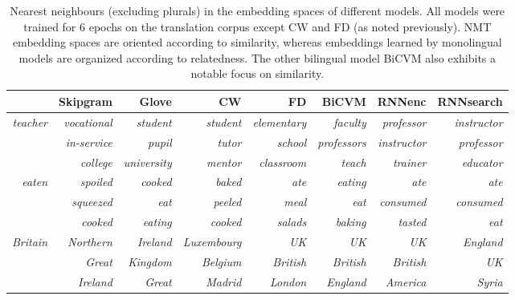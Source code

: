 \documentclass{article} %
\begin{document}
\begin{table}[t]
\begin{center}
\begin{tabular}{r | r  r  r | r r | r r}
&\bf Skipgram &\bf Glove &\bf CW&\bf FD &\bf BiCVM  &\bf RNNenc &\bf RNNsearch \\ 
\hline
\emph{teacher}  & {\small \emph{vocational}} &  {\small \emph{student}} 
& {\small \emph{student}} &{\small \emph{elementary}} & {\small  \emph{faculty}} & {\small \emph{professor}}  & {\small \emph{instructor}} \\ 
 & {\small \emph{in-service}} &  {\small \emph{pupil}} 
& {\small \emph{tutor}} & {\small \emph{school}}& {\small  \emph{professors}} & {\small \emph{instructor}}  & {\small \emph{professor}} \\ 
 & {\small \emph{college}} &  {\small \emph{university}} 
& {\small \emph{mentor}} & {\small \emph{classroom}}& {\small \emph{teach}}& {\small \emph{trainer}}  & {\small \emph{educator}} \\ 
\hdashline
\emph{eaten}  & {\small \emph{spoiled}} &  {\small \emph{cooked}} 
&  {\small \emph{baked}} &{\small \emph{ate}}& {\small  \emph{eating}}& {\small \emph{ate}} & {\small \emph{ate}} \\ 
  & {\small \emph{squeezed}} &  {\small \emph{eat}} 
&  {\small \emph{peeled}} &{\small \emph{meal}}& {\small \emph{eat}}& {\small \emph{consumed}} & {\small \emph{consumed}} \\ 
  & {\small \emph{cooked}} &  {\small \emph{eating}} 
&  {\small \emph{cooked}} &{\small \emph{salads}}& {\small \emph{baking}}& {\small \emph{tasted}} & {\small \emph{eat}} \\ 
\hdashline
\emph{Britain}  & {\small \emph{Northern}} &  {\small \emph{Ireland}} 
& {\small \emph{Luxembourg}} &{\small \emph{UK}}& {\small \emph{UK}} & {\small  \emph{UK}} & {\small \emph{England}} \\ 
& {\small \emph{Great}} &  {\small \emph{Kingdom}} 
& {\small \emph{Belgium}} &{\small \emph{British}}& {\small \emph{British}} & {\small  \emph{British}} & {\small \emph{UK}} \\ 
 & {\small \emph{Ireland}} &  {\small \emph{Great}} 
& {\small \emph{Madrid}} &{\small \emph{London}}& {\small \emph{England}} & {\small  \emph{America}} & {\small \emph{Syria}} \\ 


\end{tabular}
\caption{Nearest neighbours (excluding plurals) in the embedding spaces of different models. All models were trained for 6 epochs on the translation corpus except CW and FD (as noted previously). NMT embedding spaces are oriented according to similarity, whereas embeddings learned by monolingual models are organized according to relatedness. The other bilingual model BiCVM also exhibits a notable focus on similarity.}
\label{table:neigh}
\end{center}
\vspace{-5mm}
\end{table}
\end{document}
